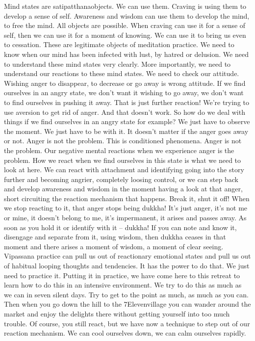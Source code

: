 \documentclass[letterpaper,10pt,english]{sphinxmanual}
\begin{document}
\sphinxAtStartPar
Mind  states  are  satipatthana\sphinxhyphen{}objects.  We  can  use  them.  Craving  is
using them to develop a sense of self. Awareness and wisdom can use them
to develop the mind, to free the mind. All objects are possible. When craving
can use it for a sense of self, then we can use it for a moment of knowing. We
can use it to bring us even to cessation. These are legitimate objects of meditation practice. We need to know when our mind has been infected with lust,
by hatred or delusion. We need to understand these mind states very clearly.
More importantly, we need to understand our reactions to these mind states.
We need to check our attitude. Wishing anger to disappear, to decrease or go
away is wrong attitude. If we find ourselves in an angry state, we don’t want
it wishing to go away, we don’t want to find ourselves in pushing it away.
That is just further reaction! We’re trying to use aversion to get rid of anger.
And that doesn’t work. So how do we deal with things if we find ourselves
in an angry state for example? We just have to observe the moment. We just
have to be with it. It doesn’t matter if the anger goes away or not. Anger is
not the problem. This is conditioned phenomena. Anger is not the problem.
Our  negative  mental  reactions  when  we  experience  anger  is  the  problem.
How we react when we find ourselves in this state is what we need to look
at here. We can react with attachment and identifying going into the story
further  and  becoming  angrier,  completely  loosing  control,  or  we  can  step
back  and  develop  awareness  and  wisdom  in  the  moment  having  a  look  at
that anger, short circuiting the reaction mechanism that happens. Break it,
shut it off! When we stop reacting to it, that anger stops being dukkha! It’s
just anger, it’s not me or mine, it doesn’t belong to me, it’s impermanent, it
arises and passes away. As soon as you hold it or identify with it – dukkha!
If you can note and know it, disengage and separate from it, using wisdom,
then dukkha ceases in that moment and there arises a moment of wisdom,
a moment of clear seeing. Vipassana practice can pull us out of reactionary
emotional states and pull us out of habitual looping thoughts and tendencies.
It has the power to do that. We just need to practice it. Putting it in practice,
we  have  come  here  to  this  retreat  to  learn  how  to  do  this  in  an  intensive
environment. We try to do this as much as we can in seven silent days. Try
to get to the point as much, as much as you can. Then when you go down the
  hill to the 7Eleven\sphinxhyphen{}village you can wander around the market and enjoy the
delights there without getting yourself into too much trouble. Of course, you
still react, but we have now a technique to step out of our reaction mechanism. We can cool ourselves down, we can calm ourselves rapidly.
\end{document}
